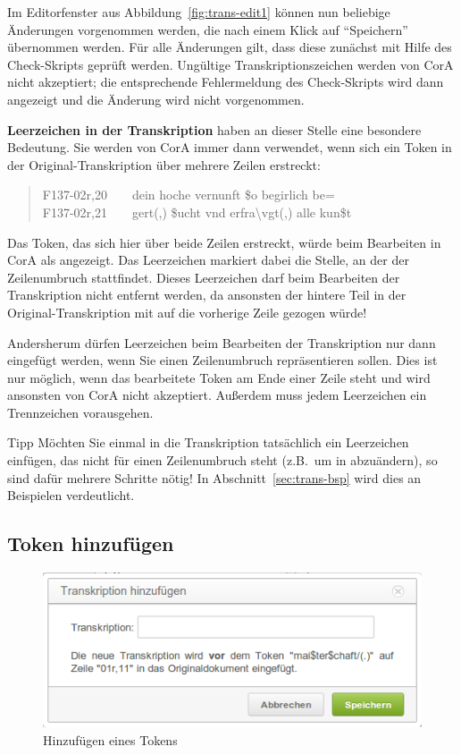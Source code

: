 \documentclass[11pt,a4paper,parskip=half]{scrartcl}
\begin{document}
Im Editorfenster aus Abbildung~\ref{fig:trans-edit1} können nun
beliebige Änderungen vorgenommen werden, die nach einem Klick auf
"`Speichern"' übernommen werden.  Für alle Änderungen gilt, dass diese
zunächst mit Hilfe des Check-Skripts geprüft werden.  Ungültige
Transkriptionszeichen werden von CorA nicht akzeptiert; die
entsprechende Fehlermeldung des Check-Skripts wird dann angezeigt und
die Änderung wird nicht vorgenommen.

\textbf{Leerzeichen in der Transkription} haben an dieser Stelle eine
besondere Bedeutung.  Sie werden von CorA immer dann verwendet, wenn
sich ein Token in der Original-Transkription über mehrere Zeilen
erstreckt:

\begin{quote}\ttfamily\small
  F137-02r,20~~~~dein hoche vernunft \$o begirlich be=\\
  F137-02r,21~~~~gert(,) \$u\*cht vnd erfra\textbackslash{}vgt(,) alle kun\$t
\end{quote}

Das Token, das sich hier über beide Zeilen erstreckt, würde beim
Bearbeiten in CorA als  angezeigt.  Das Leerzeichen
markiert dabei die Stelle, an der der Zeilenumbruch stattfindet.
Dieses Leerzeichen darf beim Bearbeiten der Transkription nicht
entfernt werden, da ansonsten der hintere Teil in der
Original-Transkription mit auf die vorherige Zeile gezogen würde!

Andersherum dürfen Leerzeichen beim Bearbeiten der Transkription nur
dann eingefügt werden, wenn Sie einen Zeilenumbruch repräsentieren
sollen.  Dies ist nur möglich, wenn das bearbeitete Token am Ende
einer Zeile steht und wird ansonsten von CorA nicht akzeptiert.
Außerdem muss jedem Leerzeichen ein Trennzeichen vorausgehen.

\begin{infobox}{Tipp}
  Möchten Sie einmal in die Transkription tatsächlich ein Leerzeichen
  einfügen, das nicht für einen Zeilenumbruch steht (z.B.\ um
   in  abzuändern), so sind dafür mehrere
  Schritte nötig!  In Abschnitt~\ref{sec:trans-bsp} wird dies an
  Beispielen verdeutlicht.
\end{infobox}

\subsection{Token hinzufügen}

\begin{figure}
  \centering
  \includegraphics[width=0.6\linewidth]{img/trans-add.png}
  \caption{Hinzufügen eines Tokens}
  \label{fig:trans-add}
\end{figure}
\end{document}
